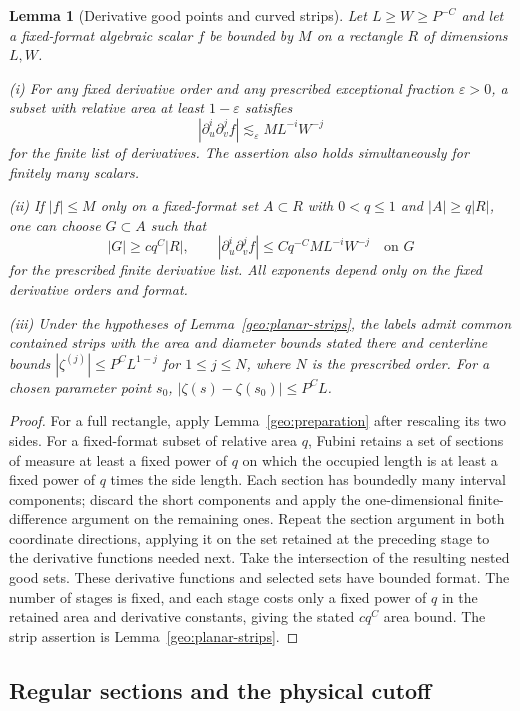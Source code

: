 \documentclass[11pt]{amsart}
\newtheorem{lemma}[theorem]{Lemma}
\theoremstyle{definition}
\theoremstyle{remark}
\numberwithin{equation}{section}
\begin{document}
\begin{lemma}[Derivative good points and curved strips]\label{geo:good-points-strips}
Let $L\ge W\ge P^{-C}$ and let a fixed-format algebraic scalar $f$ be bounded by $M$ on a rectangle $R$ of dimensions $L,W$.

\noindent\textup{(i)} For any fixed derivative order and any prescribed exceptional fraction $\varepsilon>0$, a subset with relative area at least $1-\varepsilon$ satisfies
\[
 |\partial_u^i\partial_v^j f|\lesssim_{\varepsilon} M L^{-i}W^{-j}
\]
for the finite list of derivatives. The assertion also holds simultaneously for finitely many scalars.

\noindent\textup{(ii)} If $|f|\le M$ only on a fixed-format set $A\subset R$ with $0<q\le1$ and $|A|\ge q|R|$, one can choose $G\subset A$ such that
\[
|G|\ge c q^C|R|,\qquad |\partial_u^i\partial_v^j f|\le Cq^{-C}ML^{-i}W^{-j}\quad\text{on }G
\]
for the prescribed finite derivative list. All exponents depend only on the fixed derivative orders and format.

\noindent\textup{(iii)} Under the hypotheses of Lemma~\ref{geo:planar-strips}, the labels admit common contained strips with the area and diameter bounds stated there and centerline bounds $|\zeta^{(j)}|\le P^CL^{1-j}$ for $1\le j\le N$, where $N$ is the prescribed order. For a chosen parameter point $s_0$, $|\zeta(s)-\zeta(s_0)|\le P^CL$.
\end{lemma}
\begin{proof}
For a full rectangle, apply Lemma~\ref{geo:preparation} after rescaling its two sides. For a fixed-format subset of relative area $q$, Fubini retains a set of sections of measure at least a fixed power of $q$ on which the occupied length is at least a fixed power of $q$ times the side length. Each section has boundedly many interval components; discard the short components and apply the one-dimensional finite-difference argument on the remaining ones. Repeat the section argument in both coordinate directions, applying it on the set retained at the preceding stage to the derivative functions needed next. Take the intersection of the resulting nested good sets. These derivative functions and selected sets have bounded format. The number of stages is fixed, and each stage costs only a fixed power of $q$ in the retained area and derivative constants, giving the stated $cq^C$ area bound. The strip assertion is Lemma~\ref{geo:planar-strips}.
\end{proof}

\subsection{Regular sections and the physical cutoff}\label{app:shared-regular}
\end{document}
